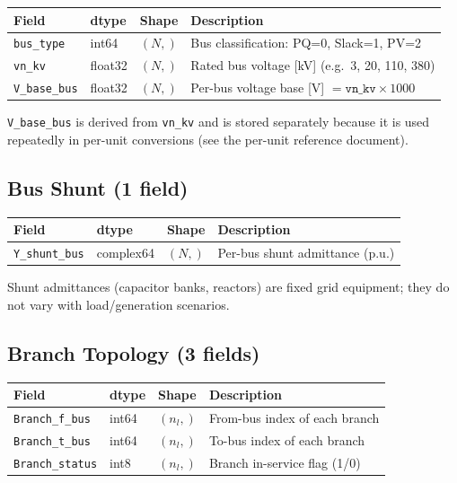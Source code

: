 \documentclass{article}
\begin{document}
\begin{table}[h]
\centering
\begin{tabular}{llll}
\toprule
Field & dtype & Shape & Description \\
\midrule
\texttt{bus\_type}   & int64   & $(N,)$ & Bus classification: PQ=0, Slack=1, PV=2 \\
\texttt{vn\_kv}      & float32 & $(N,)$ & Rated bus voltage [kV]
                                           (e.g.\ 3, 20, 110, 380) \\
\texttt{V\_base\_bus} & float32 & $(N,)$ & Per-bus voltage base [V]
                                           $= \texttt{vn\_kv} \times 1000$ \\
\bottomrule
\end{tabular}
\end{table}

\texttt{V\_base\_bus} is derived from \texttt{vn\_kv} and is stored
separately because it is used repeatedly in per-unit conversions (see
the per-unit reference document).

\subsection{Bus Shunt (1 field)}

\begin{table}[h]
\centering
\begin{tabular}{llll}
\toprule
Field & dtype & Shape & Description \\
\midrule
\texttt{Y\_shunt\_bus} & complex64 & $(N,)$ &
  Per-bus shunt admittance (p.u.) \\
\bottomrule
\end{tabular}
\end{table}

Shunt admittances (capacitor banks, reactors) are fixed grid equipment;
they do not vary with load/generation scenarios.

\subsection{Branch Topology (3 fields)}

\begin{table}[h]
\centering
\begin{tabular}{llll}
\toprule
Field & dtype & Shape & Description \\
\midrule
\texttt{Branch\_f\_bus}  & int64 & $(n_l,)$ & From-bus index of each branch \\
\texttt{Branch\_t\_bus}  & int64 & $(n_l,)$ & To-bus index of each branch \\
\texttt{Branch\_status}  & int8  & $(n_l,)$ & Branch in-service flag (1/0) \\
\bottomrule
\end{tabular}
\end{table}
\end{document}
